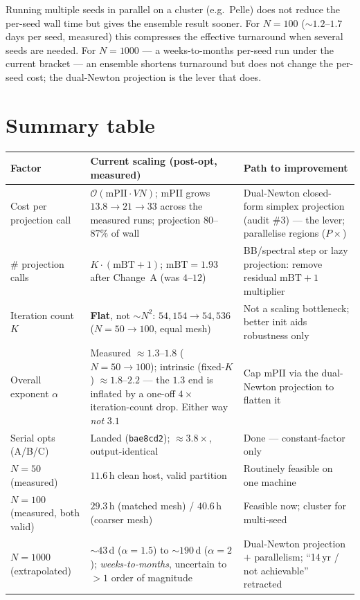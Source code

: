 \documentclass[11pt,a4paper]{article}
\begin{document}
\begin{remark}
Running multiple seeds in parallel on a cluster (e.g.\ Pelle) does not reduce
the per-seed wall time but gives the ensemble result sooner.  For $N=100$
($\sim\!1.2$--$1.7$ days per seed, measured) this compresses the effective
turnaround when several seeds are needed.  For $N=1000$ --- a weeks-to-months
per-seed run under the current bracket --- an ensemble shortens turnaround but
does not change the per-seed cost; the dual-Newton projection is the lever that
does.
\end{remark}

\section*{Summary table}

\begin{center}
\renewcommand{\arraystretch}{1.35}
\begin{tabular}{p{2.8cm}p{4.6cm}p{5.1cm}}
\toprule
\textbf{Factor} & \textbf{Current scaling (post-opt, measured)} & \textbf{Path to improvement} \\
\midrule
Cost per projection call
  & $\mathcal{O}(\mathrm{mPII}\cdot VN)$; $\mathrm{mPII}$ grows
    $13.8\to21\to33$ across the measured runs; projection $80$--$87\%$ of wall
  & Dual-Newton closed-form simplex projection (audit \#3) --- the lever;
    parallelise regions ($P\times$) \\
\# projection calls
  & $K\cdot(\mathrm{mBT}+1)$; $\mathrm{mBT}=1.93$ after Change~A (was $4$--$12$)
  & BB/spectral step or lazy projection: remove residual $\mathrm{mBT}+1$
    multiplier \\
Iteration count $K$
  & \textbf{Flat}, not $\sim\!N^2$: $54{,}154\to54{,}536$ ($N{=}50\to100$,
    equal mesh)
  & Not a scaling bottleneck; better init aids robustness only \\
Overall exponent $\alpha$
  & Measured $\approx1.3$--$1.8$ ($N{=}50\to100$); intrinsic (fixed-$K$)
    $\approx1.8$--$2.2$ --- the $1.3$ end is inflated by a one-off $4\times$
    iteration-count drop.  Either way \emph{not} $3.1$
  & Cap $\mathrm{mPII}$ via the dual-Newton projection to flatten it \\
Serial opts (A/B/C)
  & Landed (\texttt{bae8cd2}); $\approx\!3.8\times$, output-identical
  & Done --- constant-factor only \\
$N=50$ (measured)
  & $11.6$\,h clean host, valid partition
  & Routinely feasible on one machine \\
$N=100$ (measured, both valid)
  & $29.3$\,h (matched mesh) / $40.6$\,h (coarser mesh)
  & Feasible now; cluster for multi-seed \\
$N=1000$ (extrapolated)
  & $\sim\!43$\,d ($\alpha{=}1.5$) to $\sim\!190$\,d ($\alpha{=}2$);
    \emph{weeks-to-months}, uncertain to $>\!1$ order of magnitude
  & Dual-Newton projection $+$ parallelism; ``14\,yr / not achievable''
    retracted \\
\bottomrule
\end{tabular}
\end{center}



\end{document}
